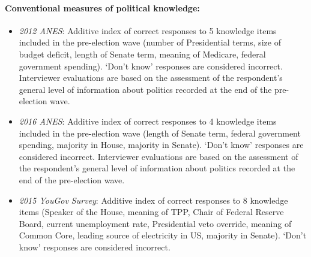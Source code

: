 \paragraph{Conventional measures of political knowledge:}
\begin{itemize}[nolistsep]
\item \textit{2012 ANES}: Additive index of correct responses to 5 knowledge items included in the pre-election wave (number of Presidential terms, size of budget deficit, length of Senate term, meaning of Medicare, federal government spending). `Don't know' responses are considered incorrect. Interviewer evaluations are based on the assessment of the respondent's general level of information about politics recorded at the end of the pre-election wave.
\item \textit{2016 ANES}: Additive index of correct responses to 4 knowledge items included in the pre-election wave (length of Senate term, federal government spending, majority in House, majority in Senate). `Don't know' responses are considered incorrect. Interviewer evaluations are based on the assessment of the respondent's general level of information about politics recorded at the end of the pre-election wave.
\item \textit{2015 YouGov Survey}: Additive index of correct responses to 8 knowledge items (Speaker of the House, meaning of TPP, Chair of Federal Reserve Board, current unemployment rate, Presidential veto override, meaning of Common Core, leading source of electricity in US, majority in Senate). `Don't know' responses are considered incorrect.
\end{itemize}

